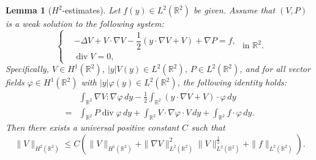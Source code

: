 \documentclass[12pt]{amsart}
\numberwithin{equation}{section}              %
\newtheorem{lemma}{Lemma}[section]
\theoremstyle{remark}
\begin{document}
		\begin{lemma}[$H^2$-estimates]\label{eq:H1est}
			Let $f(y) \in L^{2}(\mathbb{R}^{2})$ be given. Assume that $(V, P)$ is a weak solution to the following system:
			\begin{equation*}
            \left\{
				\begin{aligned}
				    &-\Delta V + V\cdot \nabla V - \dfrac{1}{2}(y \cdot \nabla V + V) + \nabla P = f  , \\
					&\operatorname{div} V = 0,           
				\end{aligned}
                  \right. \textrm{ in } \mathbb{R}^{2}.
			\end{equation*}
			Specifically, $V \in H^1(\mathbb{R}^{2})$, $|y|V(y) \in L^{2}(\mathbb{R}^{2})$, $P \in L^{2}(\mathbb{R}^{2})$, and for all vector fields $\varphi \in H^{1}(\mathbb{R}^{2})$ with $|y|\varphi(y)\in L^2(\mathbb{R}^2)$, the following identity holds:
			\begin{equation}\label{eq:weak}
				\begin{aligned}
					&\int_{\mathbb{R}^{2}} \nabla V : \nabla \varphi \, dy - \frac{1}{2} \int_{\mathbb{R}^{2}} (y \cdot \nabla V + V) \cdot \varphi \, dy \\
					=& \int_{\mathbb{R}^{2}} P \operatorname{div} \varphi \, dy + \int_{\mathbb{R}^{2}} V\cdot \nabla \varphi \cdot V \, dy + \int_{\mathbb{R}^{2}} f \cdot \varphi \, dy.
				\end{aligned} \tag{3.45}
			\end{equation}
			Then there exists a universal positive constant $C$ such that
			\begin{equation*}
				\|V\|_{H^{2}(\mathbb{R}^{2})} \leq C \left( \| V\|_{H^{1}(\mathbb{R}^{2})} + \|\nabla V\|_{L^{2}(\mathbb{R}^{2})}^{2} \| V\|_{L^{2}(\mathbb{R}^{2})}^{\frac{1}{2}} + \|f\|_{L^{2}(\mathbb{R}^{2})} \right).
			\end{equation*}
		\end{lemma} 
		
\end{document}
